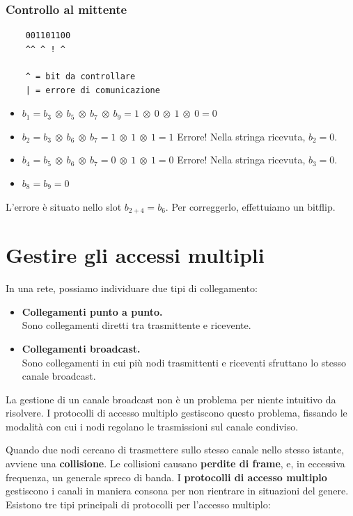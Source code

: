 \subsubsection{Controllo al mittente}
\begin{verbatim}
	001101100
	^^ ^ ! ^
	
	^ = bit da controllare
	| = errore di comunicazione
\end{verbatim}

\begin{itemize}
	\item $b_1 = b_3 \ \otimes \ b_5 \ \otimes \ b_7 \ \otimes \ b_9 =  1 \ \otimes \ 0 \ \otimes \ 1 \ \otimes \ 0 = 0$
	\item $b_2 = b_3 \ \otimes \ b_6 \ \otimes \ b_7 = 1 \ \otimes \ 1 \ \otimes \ 1  = 1$ Errore! Nella stringa ricevuta, $b_2=0$.
	\item $b_4 = b_5 \ \otimes \ b_6 \ \otimes \ b_7 = 0 \ \otimes \ 1 \ \otimes \ 1  = 0$ Errore! Nella stringa ricevuta, $b_3=0$.
	\item $b_8 = b_9 = 0 $
\end{itemize}
L'errore è situato nello slot $b_{2+4} = b_6$. Per correggerlo, effettuiamo un bitflip.
\newpage

\section{Gestire gli accessi multipli}
In una rete, possiamo individuare due tipi di collegamento:
\begin{itemize}
	\item \textbf{Collegamenti punto a punto.}\\
	Sono collegamenti diretti tra trasmittente e ricevente.
	\item \textbf{Collegamenti broadcast.}\\
	Sono collegamenti in cui più nodi trasmittenti e riceventi sfruttano lo stesso canale broadcast.
\end{itemize}

La gestione di un canale broadcast non è un problema per niente intuitivo da risolvere. I protocolli di accesso multiplo gestiscono questo problema, fissando le modalità con cui i nodi regolano le trasmissioni sul canale condiviso.

Quando due nodi cercano di trasmettere sullo stesso canale nello stesso istante, avviene una \textbf{collisione}. Le collisioni causano \textbf{perdite di frame}, e, in eccessiva frequenza, un generale spreco di banda. I \textbf{protocolli di accesso multiplo} gestiscono i canali in maniera consona per non rientrare in situazioni del genere. Esistono tre tipi principali di protocolli per l'accesso multiplo:

